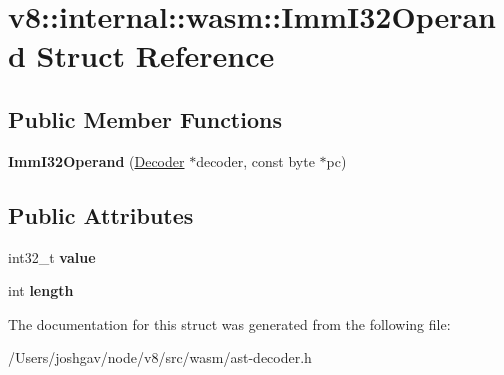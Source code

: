 \hypertarget{structv8_1_1internal_1_1wasm_1_1_imm_i32_operand}{}\section{v8\+:\+:internal\+:\+:wasm\+:\+:Imm\+I32\+Operand Struct Reference}
\label{structv8_1_1internal_1_1wasm_1_1_imm_i32_operand}
\subsection*{Public Member Functions}
\begin{DoxyCompactItemize}
\item 
{\bfseries Imm\+I32\+Operand} (\hyperlink{classv8_1_1internal_1_1wasm_1_1_decoder}{Decoder} $\ast$decoder, const byte $\ast$pc)\hypertarget{structv8_1_1internal_1_1wasm_1_1_imm_i32_operand_a41d39139ed25d0f40c5d227835fc5454}{}\label{structv8_1_1internal_1_1wasm_1_1_imm_i32_operand_a41d39139ed25d0f40c5d227835fc5454}

\end{DoxyCompactItemize}
\subsection*{Public Attributes}
\begin{DoxyCompactItemize}
\item 
int32\+\_\+t {\bfseries value}\hypertarget{structv8_1_1internal_1_1wasm_1_1_imm_i32_operand_aea1870dc2653a5e73731f6cf70600b53}{}\label{structv8_1_1internal_1_1wasm_1_1_imm_i32_operand_aea1870dc2653a5e73731f6cf70600b53}

\item 
int {\bfseries length}\hypertarget{structv8_1_1internal_1_1wasm_1_1_imm_i32_operand_a646971c1dfbdeff9b0702ecd416e0a1d}{}\label{structv8_1_1internal_1_1wasm_1_1_imm_i32_operand_a646971c1dfbdeff9b0702ecd416e0a1d}

\end{DoxyCompactItemize}


The documentation for this struct was generated from the following file\+:\begin{DoxyCompactItemize}
\item 
/\+Users/joshgav/node/v8/src/wasm/ast-\/decoder.\+h\end{DoxyCompactItemize}
